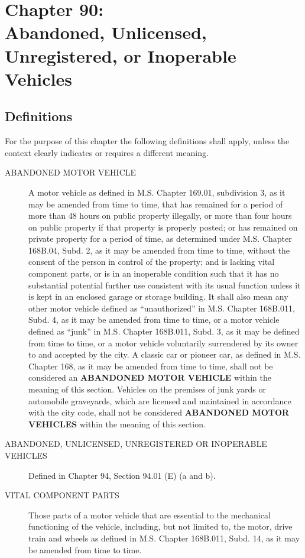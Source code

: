 \chapter*{Chapter 90: \\
	Abandoned, Unlicensed, Unregistered, or Inoperable Vehicles}
    \vfill
    \minitoc
    \pagebreak

\section{Definitions}
For the purpose of this chapter the following definitions shall apply, unless the context clearly indicates or requires a different meaning.
\begin{description}
\item[ABANDONED MOTOR VEHICLE] A motor vehicle as defined in M.S. Chapter 169.01, subdivision 3, as it may be amended from time to time, that has remained for a period of more than 48 hours on public property illegally, or more than four hours on public property if that property is properly posted; or has remained on private property for a period of time, as determined under M.S. Chapter 168B.04, Subd. 2, as it may be amended from time to time, without the consent of the person in control of the property; and is lacking vital component parts, or is in an inoperable condition such that it has no substantial potential further use consistent with its usual function unless it is kept in an enclosed garage or storage building.  It shall also mean any other motor vehicle defined as “unauthorized” in M.S. Chapter 168B.011, Subd. 4, as it may be amended from time to time, or a motor vehicle defined as “junk” in M.S. Chapter 168B.011, Subd. 3, as it may be defined from time to time, or a motor vehicle voluntarily surrendered by its owner to and accepted by the city.  A classic car or pioneer car, as defined in M.S. Chapter 168, as it may be amended from time to time, shall not be considered an \textbf{ABANDONED MOTOR VEHICLE} within the meaning of this section.  Vehicles on the premises of junk yards or automobile graveyards, which are licensed and maintained in accordance with the city code, shall not be considered \textbf{ABANDONED MOTOR VEHICLES} within the meaning of this section.
\item[ABANDONED, UNLICENSED, UNREGISTERED OR INOPERABLE VEHICLES] Defined in Chapter 94, Section 94.01 (E) (a and b).
\item[VITAL COMPONENT PARTS] Those parts of a motor vehicle that are essential to the mechanical functioning of the vehicle, including, but not limited to, the motor, drive train and wheels as defined in M.S. Chapter 168B.011, Subd. 14, as it may be amended from time to time.
\end{description}

